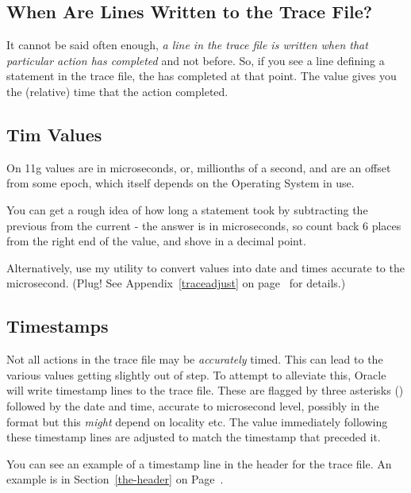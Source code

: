 \subsection{When Are Lines Written to the Trace File?}

It cannot be said often enough, \emph{a line in the trace file is written when that particular action has completed} and not before. So, if you see a line defining a  statement in the trace file, the  has completed at that point. The  value gives you the (relative) time that the action completed. 

\subsection{Tim Values}

On 11g  values are in microseconds, or, millionths of a second, and are an offset from some epoch, which itself depends on the Operating System in use.

You can get a rough idea of how long a statement took by subtracting the previous  from the current  - the answer is in microseconds, so count back 6 places from the right end of the  value, and shove in a decimal point.

Alternatively, use my  utility to convert  values into date and times accurate to the microsecond. (Plug! See Appendix~\ref{traceadjust} on page~\pageref{traceadjust} for details.)

\subsection{Timestamps}

Not all actions in the trace file may be \emph{accurately} timed. This can lead to the various  values getting slightly out of step. To attempt to alleviate this, Oracle will write timestamp lines to the trace file. These are flagged by three asterisks (\inline{***}) followed by the date and time, accurate to microsecond level, possibly in the format  but this \emph{might} depend on locality etc. The  value immediately following these timestamp lines are adjusted to match the timestamp that preceded it.

You can see an example of a timestamp line in the header for the trace file. An example is in Section~\ref{the-header} on Page~\pageref{the-header}.


